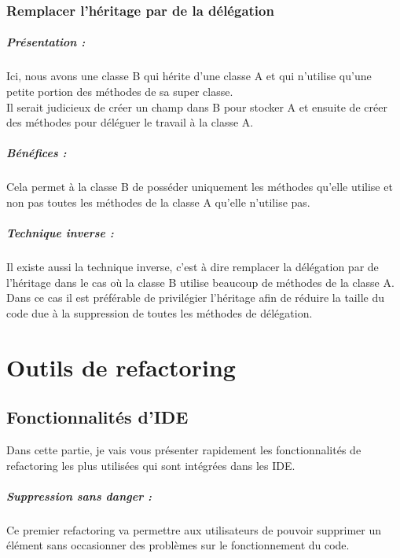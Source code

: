 \documentclass[a4paper,twoside,12pt,openright]{report}
\begin{document}
\subsection{Remplacer l'héritage par de la délégation}
\paragraph{Présentation :}
Ici, nous avons une classe B qui hérite d'une classe A et qui n'utilise qu'une petite portion des méthodes de sa super classe.\\
Il serait judicieux de créer un champ dans B pour stocker A et ensuite de créer des méthodes pour déléguer le travail à la classe A.\\

\paragraph{Bénéfices :}
Cela permet à la classe B de posséder uniquement les méthodes qu'elle utilise et non pas toutes les méthodes de la classe A qu'elle n'utilise pas.\\

\paragraph{Technique inverse :}
Il existe aussi la technique inverse, c'est à dire remplacer la délégation par de l'héritage dans le cas où la classe B utilise beaucoup de méthodes de la classe A.
Dans ce cas il est préférable de privilégier l'héritage afin de réduire la taille du code due à la suppression de toutes les méthodes de délégation.\\

\chapter{Outils de refactoring}
\section{Fonctionnalités d'IDE}
Dans cette partie, je vais vous présenter rapidement les fonctionnalités de refactoring les plus utilisées qui sont intégrées dans les IDE.\\

\paragraph{Suppression sans danger :}
Ce premier refactoring va permettre aux utilisateurs de pouvoir supprimer un élément sans occasionner des problèmes sur le fonctionnement du code.\\
\end{document}
